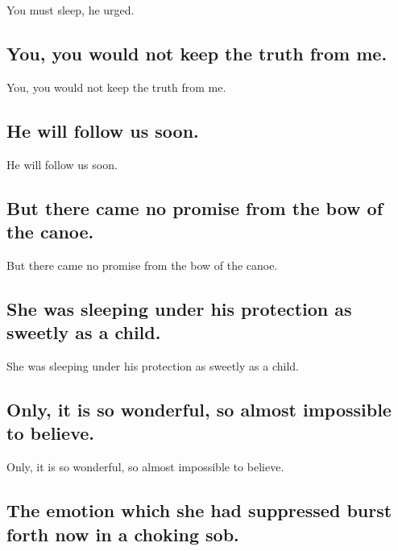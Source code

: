 \documentclass[]{article}
\begin{document}
You must sleep, he urged.

\hypertarget{you-you-would-not-keep-the-truth-from-me.}{%
\subsection{You, you would not keep the truth from
me.}\label{you-you-would-not-keep-the-truth-from-me.}}

You, you would not keep the truth from me.

\hypertarget{he-will-follow-us-soon.}{%
\subsection{He will follow us soon.}\label{he-will-follow-us-soon.}}

He will follow us soon.

\hypertarget{but-there-came-no-promise-from-the-bow-of-the-canoe.}{%
\subsection{But there came no promise from the bow of the
canoe.}\label{but-there-came-no-promise-from-the-bow-of-the-canoe.}}

But there came no promise from the bow of the canoe.

\hypertarget{she-was-sleeping-under-his-protection-as-sweetly-as-a-child.}{%
\subsection{She was sleeping under his protection as sweetly as a
child.}\label{she-was-sleeping-under-his-protection-as-sweetly-as-a-child.}}

She was sleeping under his protection as sweetly as a child.

\hypertarget{only-it-is-so-wonderful-so-almost-impossible-to-believe.}{%
\subsection{Only, it is so wonderful, so almost impossible to
believe.}\label{only-it-is-so-wonderful-so-almost-impossible-to-believe.}}

Only, it is so wonderful, so almost impossible to believe.

\hypertarget{the-emotion-which-she-had-suppressed-burst-forth-now-in-a-choking-sob.}{%
\subsection{The emotion which she had suppressed burst forth now in a
choking
sob.}\label{the-emotion-which-she-had-suppressed-burst-forth-now-in-a-choking-sob.}}
\end{document}
